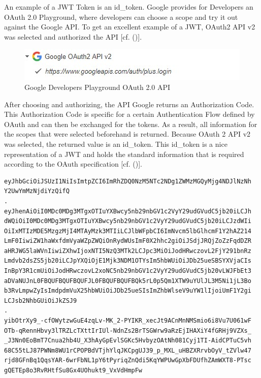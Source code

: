 {An example of a JWT Token is an id\_token. Google provides for Developers an OAuth 2.0 Playground, where developers can choose a scope and try it out against the Google API. To get an excellent example of a JWT, OAuth2 API v2 was selected and authorized the API [cf. (\cite{Google:2018:OAuthPlayground})].


\begin{figure}[h]
	\centering
	\includegraphics[width=0.8\linewidth]{images/googleOAuthPlaygroundOAuthAPI}
	\caption[OAuth API]{Google Developers Playground OAuth 2.0 API}
	\label{fig:googleoauthplaygroundoauthapi}
\end{figure}

After choosing and authorizing, the API Google returns an Authorization Code. This Authorization Code is specific for a certain Authentication Flow defined by OAuth and can then be exchanged for the tokens. As a result, all information for the scopes that were selected beforehand is returned. Because OAuth 2 API v2 was selected, the returned value is an id\_token. This id\_token is a nice representation of a JWT and holds the standard information that is required according to the OAuth specification  [cf. (\cite{Google:2018:OAuthPlayground})].



\begin{lstlisting}
eyJhbGciOiJSUzI1NiIsImtpZCI6ImRhZDQ0NzM5NTc2NDg1ZWMzMGQyMjg4NDJlNzNh
Y2UwYmMzNjdiYzQifQ
.
eyJhenAiOiI0MDc0MDg3MTgxOTIuYXBwcy5nb29nbGV1c2VyY29udGVudC5jb20iLCJh
dWQiOiI0MDc0MDg3MTgxOTIuYXBwcy5nb29nbGV1c2VyY29udGVudC5jb20iLCJzdWIi
OiIxMTIzMDE5MzgzMjI4MTAyMzk3MTIiLCJlbWFpbCI6ImNvcm5lbGlhcmF1Y2hAZ214
LmF0IiwiZW1haWxfdmVyaWZpZWQiOnRydWUsImF0X2hhc2giOiJSdjJRQjZoZzFqdDZR
aHRJWG5laWVnIiwiZXhwIjoxNTI5NzQ3MTk2LCJpc3MiOiJodHRwczovL2FjY291bnRz
Lmdvb2dsZS5jb20iLCJpYXQiOjE1Mjk3NDM1OTYsIm5hbWUiOiJDb25ueSBSYXVjaCIs
InBpY3R1cmUiOiJodHRwczovL2xoNC5nb29nbGV1c2VyY29udGVudC5jb20vLWJFbEt3
aDVaNUJnL0FBQUFBQUFBQUFJL0FBQUFBQUFBQk5rL0p5Qm1XTW9uYUlJL3M5Ni1jL3Bo
b3RvLmpwZyIsImdpdmVuX25hbWUiOiJDb25ueSIsImZhbWlseV9uYW1lIjoiUmF1Y2gi
LCJsb2NhbGUiOiJkZSJ9
.
yibOtrXy9_-cfOWytzwGuE4zqLv-MK_2-PYIKR_xecJt9ACnMnNMSmio6i8Vu7U061wF
OTb-qRennHbvy3lTRZLcTXttIrIUl-NdnZs2BrTSGWrw9aRzEjIHAXiY4fGRHj9VZXs_
_J3Nn0EoBmT7Cnua2hb4U_X3hAyGpEvlSGKc5HvbyzOAtNh081Cyj1TI-AidCPTuC5vh
68C55tLJ87PWNm8WU1rCPOPBdVTjhYlqJKCpgUJ39_p_MXL_uHBZXRrvbOyV_tZVlw47
rjd8GFnBq1QqsYAR-6wrFbNL1pY6tPyriqZnQdi5KqYWPUwGpXbFDUfhZAmWXT8-PTsc
gQETEp8o3RvRHtfSu8Gx4UOhukt9_VxVdHmpFw
\end{lstlisting}


}
